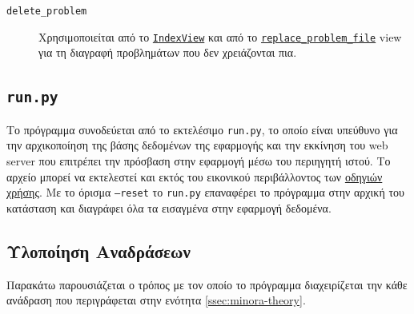 \documentclass[11pt,a4paper,titlepage]{article}
\numberwithin{equation}{section}
\begin{document}
\begin{description}
\item[\hypertarget{deleteproblem}{\texttt{delete\_problem}}] Χρησιμοποιείται από το \hyperlink{IndexView}{\texttt{IndexView}} και από το \hyperlink{replaceproblemfile}{\texttt{replace\_problem\_file}} view για τη διαγραφή προβλημάτων που δεν χρειάζονται πια.
\end{description}

\subsection{\texttt{run.py}}
Το πρόγραμμα συνοδεύεται από το εκτελέσιμο \texttt{run.py}, το οποίο είναι υπεύθυνο για την αρχικοποίηση της βάσης δεδομένων της εφαρμογής και την εκκίνηση του web server που επιτρέπει την πρόσβαση στην εφαρμογή μέσω του περιηγητή ιστού. Το αρχείο μπορεί να εκτελεστεί και εκτός του εικονικού περιβάλλοντος των \hyperref[sec:instructions]{οδηγιών χρήσης}. Με το όρισμα \texttt{--reset} το \texttt{run.py} επαναφέρει το πρόγραμμα στην αρχική του κατάσταση και διαγράφει όλα τα εισαγμένα στην εφαρμογή δεδομένα.

\subsection{Υλοποίηση Αναδράσεων}
Παρακάτω παρουσιάζεται ο τρόπος με τον οποίο το πρόγραμμα διαχειρίζεται την κάθε ανάδραση που περιγράφεται στην ενότητα \ref{ssec:minora-theory}.
\end{document}
